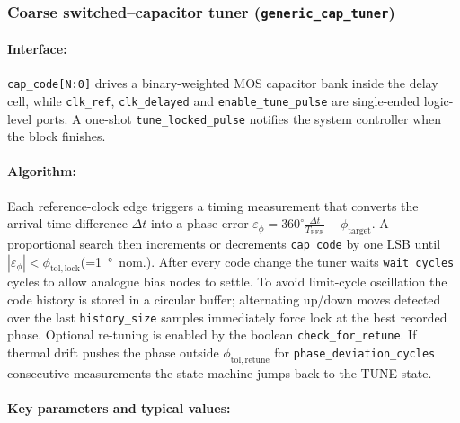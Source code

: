 \subsubsection{Coarse switched–capacitor tuner (\texttt{generic\_cap\_tuner})}
\paragraph{Interface:}

\texttt{cap\_code[N{:}0]} drives a binary-weighted MOS capacitor bank inside the delay cell,
while \texttt{clk\_ref}, \texttt{clk\_delayed} and \texttt{enable\_tune\_pulse} are single-ended logic-level ports.
A one-shot \texttt{tune\_locked\_pulse} notifies the system controller when the block finishes.

\paragraph{Algorithm:}

Each reference-clock edge triggers a timing measurement that converts the arrival-time difference
\(\Delta t\) into a phase error
\(\varepsilon_\phi = 360^\circ \tfrac{\Delta t}{T_{\mathrm{REF}}}-\phi_\mathrm{target}\).
A proportional search then increments or decrements \texttt{cap\_code} by one LSB
until \(|\varepsilon_\phi|<\phi_\mathrm{tol,lock}\)\;(=\SI{1}{\degree}~nom.).
After every code change the tuner waits \texttt{wait\_cycles} cycles to allow analogue bias nodes to settle.
To avoid limit-cycle oscillation the code history is stored in a circular buffer; alternating up/down moves
detected over the last \texttt{history\_size} samples immediately force lock at the best recorded phase.
Optional re-tuning is enabled by the boolean \texttt{check\_for\_retune}.
If thermal drift pushes the phase outside \(\phi_\mathrm{tol,retune}\) for
\texttt{phase\_deviation\_cycles} consecutive measurements the state machine jumps back to the TUNE state.

\paragraph{Key parameters and typical values:}

